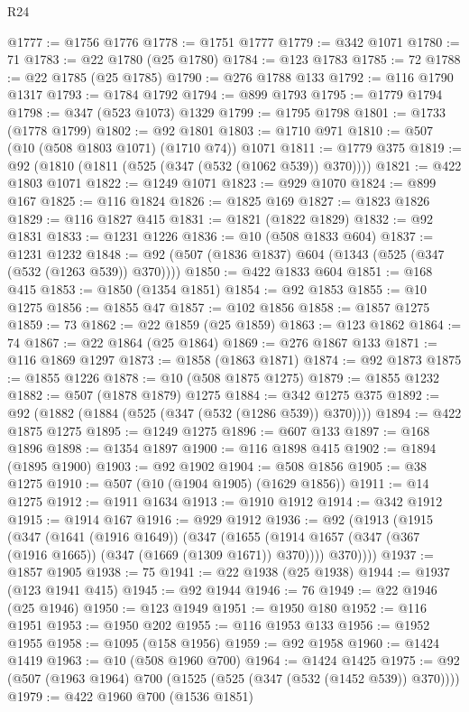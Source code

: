 \begin{lexlean}{R24}
\begin{coremodule}
{{{{{{{{{{{{{{{{{{{{{{{{{{{{{{{{{{{{{{{{{{{{{{{{{{{{{{{{{{{{{{{{{{{{{{{{{{{{{{{{{{{{{{{{{{{{{{{{{{{{{{{{{{{{{{{{{{{{{{{{{{{{{{{{{{{{{{{{{{{{{{{{{{{{{{{{{{{{{{{{{{{{{{{{{{{{{{{{{{{{{{{{{{{{{{{{{{{@1777 := @1756 @1776
@1778 := @1751 @1777
@1779 := @342 @1071
@1780 := 71
@1783 := @22 @1780 (@25 @1780)
@1784 := @123 @1783
@1785 := 72
@1788 := @22 @1785 (@25 @1785)
@1790 := @276 @1788 @133
@1792 := @116 @1790 @1317
@1793 := @1784 @1792
@1794 := @899 @1793
@1795 := @1779 @1794
@1798 := @347 (@523 @1073) @1329
@1799 := @1795 @1798
@1801 := @1733 (@1778 @1799)
@1802 := @92 @1801
@1803 := @1710 @971
@1810 := @507 (@10 (@508 @1803 @1071) (@1710 @74)) @1071
@1811 := @1779 @375
@1819 := @92 (@1810 (@1811 (@525 (@347 (@532 (@1062 @539)) @370))))
@1821 := @422 @1803 @1071
@1822 := @1249 @1071
@1823 := @929 @1070
@1824 := @899 @167
@1825 := @116 @1824
@1826 := @1825 @169
@1827 := @1823 @1826
@1829 := @116 @1827 @415
@1831 := @1821 (@1822 @1829)
@1832 := @92 @1831
@1833 := @1231 @1226
@1836 := @10 (@508 @1833 @604)
@1837 := @1231 @1232
@1848 := @92 (@507 (@1836 @1837) @604 (@1343 (@525 (@347 (@532 (@1263 @539)) @370))))
@1850 := @422 @1833 @604
@1851 := @168 @415
@1853 := @1850 (@1354 @1851)
@1854 := @92 @1853
@1855 := @10 @1275
@1856 := @1855 @47
@1857 := @102 @1856
@1858 := @1857 @1275
@1859 := 73
@1862 := @22 @1859 (@25 @1859)
@1863 := @123 @1862
@1864 := 74
@1867 := @22 @1864 (@25 @1864)
@1869 := @276 @1867 @133
@1871 := @116 @1869 @1297
@1873 := @1858 (@1863 @1871)
@1874 := @92 @1873
@1875 := @1855 @1226
@1878 := @10 (@508 @1875 @1275)
@1879 := @1855 @1232
@1882 := @507 (@1878 @1879) @1275
@1884 := @342 @1275 @375
@1892 := @92 (@1882 (@1884 (@525 (@347 (@532 (@1286 @539)) @370))))
@1894 := @422 @1875 @1275
@1895 := @1249 @1275
@1896 := @607 @133
@1897 := @168 @1896
@1898 := @1354 @1897
@1900 := @116 @1898 @415
@1902 := @1894 (@1895 @1900)
@1903 := @92 @1902
@1904 := @508 @1856
@1905 := @38 @1275
@1910 := @507 (@10 (@1904 @1905) (@1629 @1856))
@1911 := @14 @1275
@1912 := @1911 @1634
@1913 := @1910 @1912
@1914 := @342 @1912
@1915 := @1914 @167
@1916 := @929 @1912
@1936 := @92
    (@1913
      (@1915
        (@347
          (@1641 (@1916 @1649))
          (@347
            (@1655 (@1914 @1657 (@347 (@367 (@1916 @1665)) (@347 (@1669 (@1309 @1671)) @370))))
            @370))))
@1937 := @1857 @1905
@1938 := 75
@1941 := @22 @1938 (@25 @1938)
@1944 := @1937 (@123 @1941 @415)
@1945 := @92 @1944
@1946 := 76
@1949 := @22 @1946 (@25 @1946)
@1950 := @123 @1949
@1951 := @1950 @180
@1952 := @116 @1951
@1953 := @1950 @202
@1955 := @116 @1953 @133
@1956 := @1952 @1955
@1958 := @1095 (@158 @1956)
@1959 := @92 @1958
@1960 := @1424 @1419
@1963 := @10 (@508 @1960 @700)
@1964 := @1424 @1425
@1975 := @92 (@507 (@1963 @1964) @700 (@1525 (@525 (@347 (@532 (@1452 @539)) @370))))
@1979 := @422 @1960 @700 (@1536 @1851)
}}}}}}}}}}}}}}}}}}}}}}}}}}}}}}}}}}}}}}}}}}}}}}}}}}}}}}}}}}}}}}}}}}}}}}}}}}}}}}}}}}}}}}}}}}}}}}}}}}}}}}}}}}}}}}}}}}}}}}}}}}}}}}}}}}}}}}}}}}}}}}}}}}}}}}}}}}}}}}}}}}}}}}}}}}}}}}}}}}}}}}}}}}}}}}}}}}}
\end{coremodule}
\end{lexlean}

